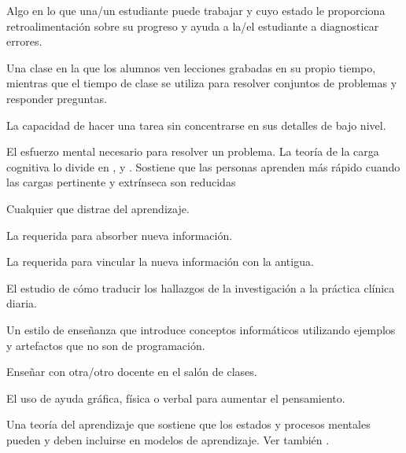 \begin{description}
 Algo en lo que una/un estudiante puede trabajar
y cuyo estado le  proporciona retroalimentación sobre su  progreso y ayuda a la/el estudiante a diagnosticar errores.

 Una clase en la que los alumnos
ven lecciones grabadas en su propio tiempo, mientras que el tiempo de clase
se utiliza para resolver conjuntos de problemas y responder preguntas.

 La capacidad de hacer una tarea sin
concentrarse en sus detalles de bajo nivel.

 El esfuerzo mental necesario para resolver un problema.
La teoría de la carga cognitiva lo divide en
 ,
y .
Sostiene que las personas aprenden más rápido cuando las cargas pertinente y extrínseca son reducidas

 Cualquier 
que distrae del aprendizaje.

 La 
requerida para absorber nueva información.

 La 
requerida para vincular la nueva información con la antigua.

 El estudio de cómo traducir
los hallazgos de la investigación a la práctica clínica diaria.

 Un estilo de enseñanza que introduce
conceptos informáticos utilizando ejemplos y artefactos que no son de programación.

 Enseñar con otra/otro docente en el
salón de clases.

 El uso de ayuda gráfica,
física o verbal para aumentar el pensamiento.

 Una teoría del aprendizaje que sostiene que los estados y procesos mentales pueden y deben incluirse en modelos de aprendizaje. Ver también
.


\end{description}
